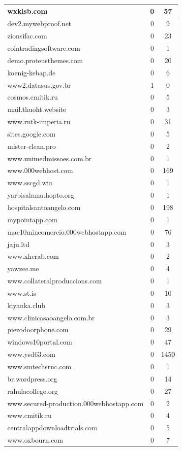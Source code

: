 \documentclass[a4paper, 11pt, oneside]{report}
\begin{document}
\begin{longtable}[!ht]{|l|c|c|}
\hline
wxklsb.com&0&57\\
\hline
dev2.mywebproof.net&0&9\\
\hline
zionsifac.com&0&23\\
\hline
cointradingsoftware.com&0&1\\
\hline
demo.proteusthemes.com&0&20\\
\hline
koenig-kebap.de&0&6\\
\hline
www2.datasus.gov.br&1&0\\
\hline
cosmos.cmitik.ru&0&5\\
\hline
mail.thuoht.website&0&3\\
\hline
www.rntk-imperia.ru&0&31\\
\hline
sites.google.com&0&5\\
\hline
mister-clean.pro&0&2\\
\hline
www.unimedmissoes.com.br&0&1\\
\hline
www.000webhost.com&0&169\\
\hline
www.sscgd.win&0&1\\
\hline
yarbisalama.hopto.org&0&1\\
\hline
hospitalsantoangelo.com&0&198\\
\hline
mypointapp.com&0&1\\
\hline
mac10mincomercio.000webhostapp.com&0&76\\
\hline
jaju.ltd&0&3\\
\hline
www.xhcrab.com&0&2\\
\hline
yawzee.me&0&4\\
\hline
www.collateralproduccions.com&0&1\\
\hline
www.st.is&0&10\\
\hline
kiyanka.club&0&3\\
\hline
www.clinicasaoangelo.com.br&0&3\\
\hline
piezodoorphone.com&0&29\\
\hline
windows10portal.com&0&47\\
\hline
www.ysd63.com&0&1450\\
\hline
www.smtechsrnc.com&0&1\\
\hline
br.wordpress.org&0&14\\
\hline
rahulacollege.org&0&27\\
\hline
www.secured-production.000webhostapp.com&0&2\\
\hline
www.cmitik.ru&0&4\\
\hline
centralappdownloadtrials.com&0&5\\
\hline
www.oxbourn.com&0&7\\

\end{longtable}
\end{document}
